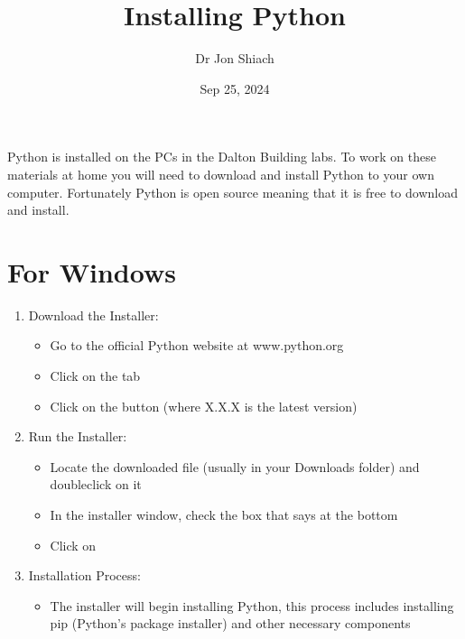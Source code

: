 \documentclass[letterpaper,10pt,english]{jupyterBook}
\title{Installing Python}
\date{Sep 25, 2024}
\author{Dr Jon Shiach}
\begin{document}
\pagestyle{empty}
\sphinxmaketitle
\pagestyle{plain}
\sphinxtableofcontents
\pagestyle{normal}
\label{\detokenize{_pages/0.1_Installing_Python::doc}}


\sphinxAtStartPar
Python is installed on the PCs in the Dalton Building labs. To work on these materials at home you will need to download and install Python to your own computer. Fortunately Python is open source meaning that it is free to download and install.


\part{For Windows}
\label{\detokenize{_pages/0.1_Installing_Python:for-windows}}\begin{enumerate}
%
\item {} 
\sphinxAtStartPar
Download the Installer:
\begin{itemize}
\item {} 
\sphinxAtStartPar
Go to the official Python website at www.python.org

\item {} 
\sphinxAtStartPar
Click on the  tab

\item {} 
\sphinxAtStartPar
Click on the  button (where X.X.X is the latest version)

\end{itemize}

\item {} 
\sphinxAtStartPar
Run the Installer:
\begin{itemize}
\item {} 
\sphinxAtStartPar
Locate the downloaded file (usually in your Downloads folder) and double\sphinxhyphen{}click on it

\item {} 
\sphinxAtStartPar
In the installer window, check the box that says  at the bottom

\item {} 
\sphinxAtStartPar
Click on 

\end{itemize}

\item {} 
\sphinxAtStartPar
Installation Process:
\begin{itemize}
\item {} 
\sphinxAtStartPar
The installer will begin installing Python, this process includes installing pip (Python’s package installer) and other necessary components


\end{itemize}
\end{enumerate}
\end{document}
